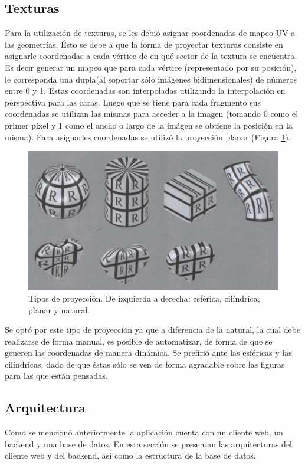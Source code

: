 \documentclass[12pt]{article}
\begin{document}
\subsection{Texturas}
\noindent Para la utilización de texturas, se les debió asignar coordenadas de mapeo UV a las geometrías. Ésto se debe a que la forma de proyectar texturas consiste en asignarle coordenadas a cada vértice de en qué sector de la textura se encuentra. Es decir generar un mapeo que para cada vértice (representado por su posición), le corresponda una dupla(al soportar sólo imágenes bidimensionales) de números entre 0 y 1.  Estas coordenadas son interpoladas utilizando la interpolación en perspectiva para las caras\cite{realtimerendering}\cite{engine}. Luego que se tiene para cada fragmento sus coordenadas se utilizan las mismas para acceder a la imagen (tomando 0 como el primer píxel y 1 como el ancho o largo de la imágen se obtiene la posición en la misma). Para asignarles coordenadas se utilizó la proyección planar\cite{realtimerendering} (Figura \ref{texturas}).
\begin{figure}[h!]
\includegraphics[width =0.7\linewidth, center]{proyecciones.png}
\caption{Tipos de proyección. De izquierda a derecha: esférica, cilíndrica, planar y natural.}
\label{texturas}
\end{figure}

Se optó por este tipo de proyección ya que a diferencia de la natural, la cual debe realizarse de forma manual, es posible de automatizar, de forma de que se generen las coordenadas de manera dinámica. Se prefirió ante las esféricas y las cilíndricas, dado de que éstas sólo se ven de forma agradable sobre las figuras para las que están pensadas.

\clearpage
\subsection{Arquitectura}
\noindent Como se mencionó anteriormente la aplicación cuenta con un cliente web, un backend y una base de datos. En esta sección se presentan las arquitecturas del cliente web y del backend, así como la estructura de la base de datos.
\end{document}
